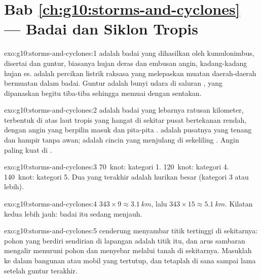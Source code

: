 \section*{Bab \ref{ch:g10:storms-and-cyclones} --- Badai dan Siklon Tropis}

\begin{solution}{exo:g10:storms-and-cyclones:1}
 adalah badai yang dihasilkan oleh kumulonimbus, disertai 
dan guntur, biasanya hujan deras dan embusan angin, kadang-kadang hujan es.
 adalah percikan listrik raksasa yang melepaskan muatan daerah-daerah
bermuatan dalam badai. Guntur adalah bunyi udara di saluran , yang
dipanaskan begitu tiba-tiba sehingga memuai dengan sentakan.
\end{solution}

\begin{solution}{exo:g10:storms-and-cyclones:2}
 adalah badai yang lebarnya ratusan kilometer, terbentuk di atas
laut tropis yang hangat di sekitar pusat bertekanan rendah, dengan angin yang
berpilin masuk dan pita-pita .  adalah pusatnya yang tenang
dan hampir tanpa awan;  adalah cincin  yang menjulang
di sekeliling . Angin paling kuat di .
\end{solution}

\begin{solution}{exo:g10:storms-and-cyclones:3}
\num{70}~knot: kategori 1. \num{120}~knot: kategori 4.
\num{140}~knot: kategori 5. Dua yang terakhir adalah hurikan besar (kategori 3
atau lebih).
\end{solution}

\begin{solution}{exo:g10:storms-and-cyclones:4}
$343 \times 9 \approx \qty{3.1}{km}$, lalu $343 \times 15 \approx
\qty{5.1}{km}$. Kilatan kedua lebih jauh: badai itu sedang menjauh.
\end{solution}

\begin{solution}{exo:g10:storms-and-cyclones:5}
 cenderung menyambar titik tertinggi di sekitarnya: pohon yang berdiri
sendirian di lapangan adalah titik itu, dan arus sambaran mengalir menuruni
pohon dan menyebar melalui tanah di sekitarnya. Masuklah ke dalam bangunan
atau mobil yang tertutup, dan tetaplah di sana sampai lama setelah guntur
terakhir.
\end{solution}

